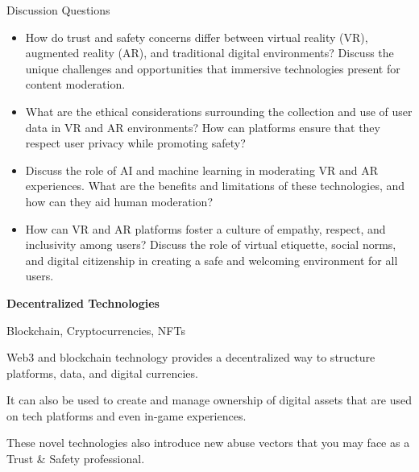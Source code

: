 \documentclass[nobackground,dvipsnames,table]{beamer}
\begin{document}
\begin{frame}{Discussion Questions}

\small{
\begin{itemize}
    \item How do trust and safety concerns differ between virtual reality (VR), augmented reality (AR), and traditional digital environments? Discuss the unique challenges and opportunities that immersive technologies present for content moderation.
    \item What are the ethical considerations surrounding the collection and use of user data in VR and AR environments? How can platforms ensure that they respect user privacy while promoting safety?
    \item Discuss the role of AI and machine learning in moderating VR and AR experiences. What are the benefits and limitations of these technologies, and how can they aid human moderation?
    \item How can VR and AR platforms foster a culture of empathy, respect, and inclusivity among users? Discuss the role of virtual etiquette, social norms, and digital citizenship in creating a safe and welcoming environment for all users.
\end{itemize}
}

\end{frame}




\begin{frame}{}

\Huge{\textbf{Decentralized Technologies}}

\end{frame}





\begin{frame}{Blockchain, Cryptocurrencies, NFTs}

Web3 and blockchain technology provides a decentralized way to structure platforms, data, and digital currencies. \newline 

It can also be used to create and manage ownership of digital assets that are used on tech platforms and even in-game experiences. \newline 

These novel technologies also introduce new abuse vectors that you may face as a Trust \& Safety professional.


\end{frame}
\end{document}
